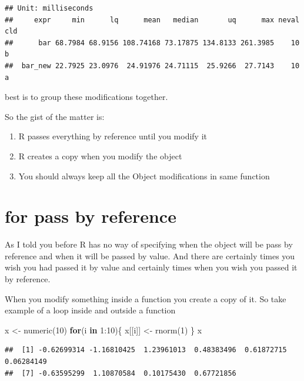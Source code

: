 \documentclass[
]{book}
\newenvironment{Shaded}{\begin{snugshade}}{\end{snugshade}}
\newcommand{\ControlFlowTok}[1]{\textcolor[rgb]{0.13,0.29,0.53}{\textbf{#1}}}
\newcommand{\DecValTok}[1]{\textcolor[rgb]{0.00,0.00,0.81}{#1}}
\newcommand{\FunctionTok}[1]{\textcolor[rgb]{0.00,0.00,0.00}{#1}}
\newcommand{\NormalTok}[1]{#1}
\newcommand{\OtherTok}[1]{\textcolor[rgb]{0.56,0.35,0.01}{#1}}
\newcommand{\SpecialCharTok}[1]{\textcolor[rgb]{0.00,0.00,0.00}{#1}}
\providecommand{\tightlist}{%
  \setlength{\itemsep}{0pt}\setlength{\parskip}{0pt}}
\begin{document}
\begin{verbatim}
## Unit: milliseconds
##     expr     min      lq      mean   median       uq      max neval cld
##      bar 68.7984 68.9156 108.74168 73.17875 134.8133 261.3985    10   b
##  bar_new 22.7925 23.0976  24.91976 24.71115  25.9266  27.7143    10  a
\end{verbatim}

best is to group these modifications together.

So the gist of the matter is:

\begin{enumerate}
\def\labelenumi{\arabic{enumi}.}
\tightlist
\item
  R passes everything by reference until you modify it
\item
  R creates a copy when you modify the object
\item
  You should always keep all the Object modifications in same function
\end{enumerate}

\hypertarget{for-pass-by-reference}{%
\section{for pass by reference}\label{for-pass-by-reference}}

As I told you before R has no way of specifying when the object will be pass by reference and when it will be passed by value. And there are certainly times you wish you had passed it by value and certainly times when you wish you passed it by reference.

When you modify something inside a function you create a copy of it. So take example of a loop inside and outside a function

\begin{Shaded}
\begin{Highlighting}[]
\NormalTok{x }\OtherTok{\textless{}{-}} \FunctionTok{numeric}\NormalTok{(}\DecValTok{10}\NormalTok{)}
\ControlFlowTok{for}\NormalTok{(i }\ControlFlowTok{in} \DecValTok{1}\SpecialCharTok{:}\DecValTok{10}\NormalTok{)\{}
\NormalTok{  x[[i]] }\OtherTok{\textless{}{-}} \FunctionTok{rnorm}\NormalTok{(}\DecValTok{1}\NormalTok{)}
\NormalTok{\}}
\NormalTok{x}
\end{Highlighting}
\end{Shaded}

\begin{verbatim}
##  [1] -0.62699314 -1.16810425  1.23961013  0.48383496  0.61872715  0.06284149
##  [7] -0.63595299  1.10870584  0.10175430  0.67721856
\end{verbatim}
\end{document}
